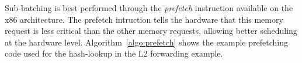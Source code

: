 

Sub-batching is best performed through the {\em prefetch} instruction available
on the x86 architecture. The prefetch intruction tells the hardware that this memory request is less
critical than the other memory requests, allowing better scheduling at the hardware level. Algorithm~\ref{algo:prefetch}
shows the example prefetching code used for the hash-lookup in the L2 forwarding example.

